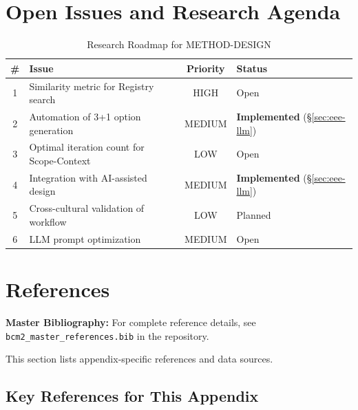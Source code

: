 \section{Open Issues and Research Agenda}
\label{sec:eee-open}

\begin{table}[htbp]
\centering
\caption{Research Roadmap for METHOD-DESIGN}
\label{tab:eee-roadmap}
\renewcommand{\arraystretch}{1.3}
\begin{tabular}{@{}clcl@{}}
\toprule
\textbf{\#} & \textbf{Issue} & \textbf{Priority} & \textbf{Status} \\
\midrule
1 & Similarity metric for Registry search & HIGH & Open \\
2 & Automation of 3+1 option generation & MEDIUM & \textbf{Implemented} (§\ref{sec:eee-llm}) \\
3 & Optimal iteration count for Scope-Context & LOW & Open \\
4 & Integration with AI-assisted design & MEDIUM & \textbf{Implemented} (§\ref{sec:eee-llm}) \\
5 & Cross-cultural validation of workflow & LOW & Planned \\
6 & LLM prompt optimization & MEDIUM & Open \\
\bottomrule
\end{tabular}
\end{table}


\section{References}
\label{sec:eee-references}

\begin{tcolorbox}[colback=blue!5!white, colframe=blue!75!black]
\textbf{Master Bibliography:} For complete reference details, see
\texttt{bcm2\_master\_references.bib} in the repository.

This section lists appendix-specific references and data sources.
\end{tcolorbox}

\vspace{0.5em}

\subsection{Key References for This Appendix}

